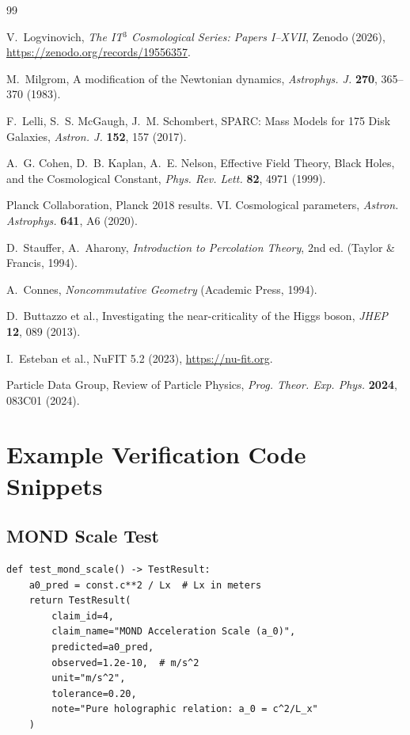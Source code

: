 \documentclass[12pt, a4paper]{article}
\begin{document}
\begin{thebibliography}{99}

V.~Logvinovich, \textit{The IT$^3$ Cosmological Series: Papers I--XVII},
Zenodo (2026), \url{https://zenodo.org/records/19556357}.

M.~Milgrom, A modification of the Newtonian dynamics,
\textit{Astrophys. J.} \textbf{270}, 365--370 (1983).

F.~Lelli, S.~S. McGaugh, J.~M. Schombert,
SPARC: Mass Models for 175 Disk Galaxies,
\textit{Astron. J.} \textbf{152}, 157 (2017).

A.~G. Cohen, D.~B. Kaplan, A.~E. Nelson,
Effective Field Theory, Black Holes, and the Cosmological Constant,
\textit{Phys. Rev. Lett.} \textbf{82}, 4971 (1999).

Planck Collaboration,
Planck 2018 results. VI. Cosmological parameters,
\textit{Astron. Astrophys.} \textbf{641}, A6 (2020).

D.~Stauffer, A.~Aharony,
\textit{Introduction to Percolation Theory}, 2nd ed. (Taylor \& Francis, 1994).

A.~Connes,
\textit{Noncommutative Geometry} (Academic Press, 1994).

D.~Buttazzo et al.,
Investigating the near-criticality of the Higgs boson,
\textit{JHEP} \textbf{12}, 089 (2013).

I.~Esteban et al.,
NuFIT 5.2 (2023), \url{https://nu-fit.org}.

Particle Data Group,
Review of Particle Physics,
\textit{Prog. Theor. Exp. Phys.} \textbf{2024}, 083C01 (2024).

\end{thebibliography}

\appendix
\section{Example Verification Code Snippets}
\label{app:code}

\subsection{MOND Scale Test}
\begin{lstlisting}[style=verifstyle, caption={Verification of $a_0 = c^2/L_x$.}, label={lst:a0}]
def test_mond_scale() -> TestResult:
    a0_pred = const.c**2 / Lx  # Lx in meters
    return TestResult(
        claim_id=4,
        claim_name="MOND Acceleration Scale (a_0)",
        predicted=a0_pred,
        observed=1.2e-10,  # m/s^2
        unit="m/s^2",
        tolerance=0.20,
        note="Pure holographic relation: a_0 = c^2/L_x"
    )
\end{lstlisting}
\end{document}
